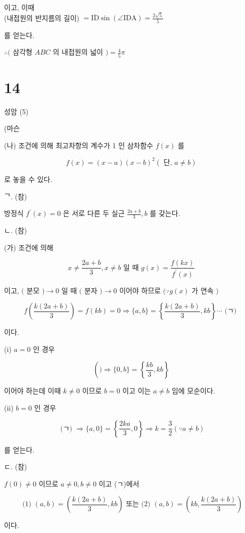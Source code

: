 \documentclass[10pt]{article}
\begin{document}
이고, 이때\\
(내접원의 반지름의 길이) \(=\overline{\mathrm{ID}} \sin (\angle \mathrm{IDA})=\frac{2 \sqrt{5}}{5}\)

를 얻는다.

\(\therefore(\) 삼각형 \(A B C\) 의 내접원의 넓이 \()=\frac{4}{5} \pi\)

\section*{14}
성암 (5)

(마슨

(나) 조건에 의해 최고차항의 계수가 1 인 삼차함수 \(f(x)\) 를

\[
f(x)=(x-a)(x-b)^{2}(\text { 단, } a \neq b)
\]

로 놓을 수 있다.

ᄀ. (참)

방정식 \(f^{\prime}(x)=0\) 은 서로 다른 두 실근 \(\frac{2 a+b}{3}, b\) 를 갖는다.

ㄴ. (참)

(가) 조건에 의해

\[
x \neq \frac{2 a+b}{3}, x \neq b \text { 일 때 } g(x)=\frac{f(k x)}{f^{\prime}(x)}
\]

이고, \((\) 분모 \() \rightarrow 0\) 일 때 \((\) 분자 \() \rightarrow 0\) 이어야 하므로 \((\because g(x)\) 가 연속 \()\)

\[
f\left(\frac{k(2 a+b)}{3}\right)=f(k b)=0 \Rightarrow\{a, b\}=\left\{\frac{k(2 a+b)}{3}, k b\right\} \cdots \text { (ㄱ) }
\]

이다.

(i) \(a=0\) 인 경우

\[
\left(\mathcal{)} \Rightarrow\{0, b\}=\left\{\frac{k b}{3}, k b\right\}\right.
\]

이어야 하는데 이때 \(k \neq 0\) 이므로 \(b=0\) 이고 이는 \(a \neq b\) 임에 모순이다.

(ii) \(b=0\) 인 경우

\[
\text { (ㄱ) } \Rightarrow\{a, 0\}=\left\{\frac{2 k a}{3}, 0\right\} \Rightarrow k=\frac{3}{2}(\because a \neq b)
\]

를 얻는다.

ㄷ. (참)

\(f(0) \neq 0\) 이므로 \(a \neq 0, b \neq 0\) 이고 (ㄱ)에서

\[
\text { (1) }(a, b)=\left(\frac{k(2 a+b)}{3}, k b\right) \text { 또는 (2) }(a, b)=\left(k b, \frac{k(2 a+b)}{3}\right)
\]

이다.
\end{document}
